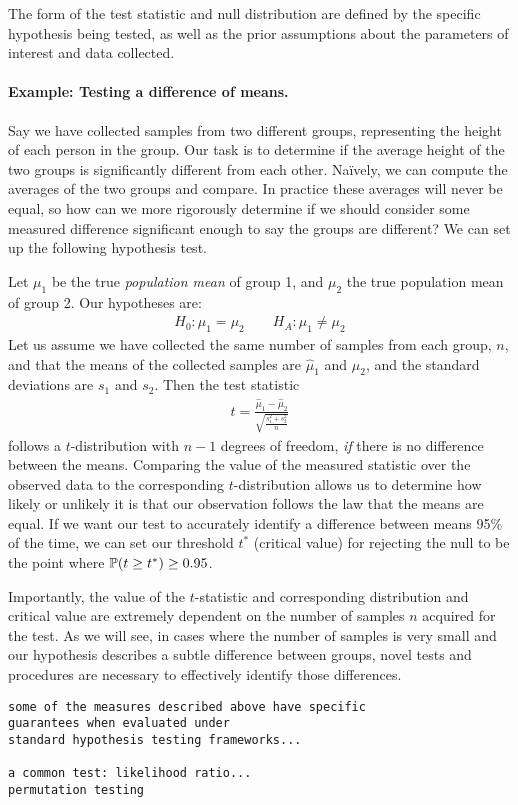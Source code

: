 The form of the test statistic and null distribution
are defined by the specific hypothesis being tested,
as well as the prior assumptions about the parameters
of interest and data collected.

\paragraph{Example: Testing a difference of means.} 
Say we have collected samples from two different groups,
representing the height of each person in the group.
Our task is to determine if the average height
of the two groups is significantly different from each other.
Na\"ively, we can compute the averages of the two groups and compare.
In practice these averages will never be equal, so how can we 
more rigorously determine if we should consider some measured difference
significant enough to say the groups are different?
We can set up the following hypothesis test.

Let $\mu_1$ be the true \textit{population mean} of group 1,
and $\mu_2$ the true population mean of group 2.
Our hypotheses are:
\begin{align}
H_0: \mu_1 = \mu_2 \qquad H_A: \mu_1 \neq \mu_2
\end{align}
Let us assume we have collected the same number of samples from each group,
$n$, and that the means of the collected samples are $\hat{\mu}_1$ and $\hat{\mu}_2$,
and the standard deviations are $s_1$ and $s_2$.
Then the test statistic
\begin{align}
t = \frac{\hat{\mu}_1 - \hat{\mu}_2}{\sqrt{\frac{s_1^2 + s_2^2}{n}}}
\end{align}
follows a $t$-distribution with $n-1$ degrees of freedom,
\textit{if} there is no difference between the means.
Comparing the value of the measured statistic over the observed data
to the corresponding $t$-distribution allows
us to determine how likely or unlikely it is that 
our observation follows the law that the means are equal.
If we want our test to accurately identify
a difference between means 95\% of the time,
we can set our threshold $t^*$ (critical value) for rejecting the null
to be the point where $\mathbb{P}(t \geq t^*) \geq 0.95$.

Importantly, the value of the $t$-statistic and corresponding
distribution and critical value are extremely
dependent on the number of samples $n$ acquired for the test.
As we will see, in cases where the number of samples is 
very small and our hypothesis describes 
a subtle difference between groups,
novel tests and procedures are necessary
to effectively identify those differences.


\begin{verbatim}
some of the measures described above have specific 
guarantees when evaluated under
standard hypothesis testing frameworks...

a common test: likelihood ratio...
permutation testing
\end{verbatim}

